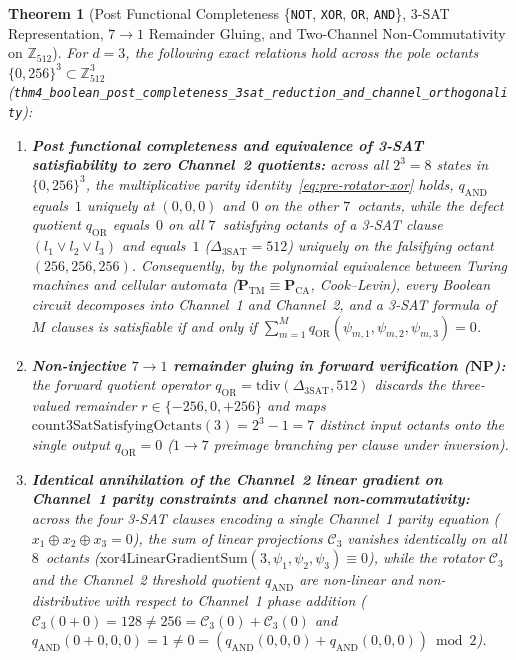 \documentclass[11pt,a4paper]{article}
\theoremstyle{plain}
\newtheorem{theorem}{Theorem}[section]
\theoremstyle{definition}
\begin{document}
\begin{theorem}[Post Functional Completeness \{\texttt{NOT}, \texttt{XOR}, \texttt{OR}, \texttt{AND}\}, 3-SAT Representation, $7\to 1$ Remainder Gluing, and Two-Channel Non-Commutativity on $\mathbb{Z}_{512}$]
\label{thm:main-4}
For $d=3$, the following exact relations hold across the pole octants $\{0,256\}^3\subset\mathbb{Z}_{512}^3$ (\texttt{thm4\_boolean\_post\_completeness\_3sat\_reduction\_and\_channel\_orthogonality}):
\begin{enumerate}[label=\textbf{(\roman*)},leftmargin=*]
\item \textbf{Post functional completeness and equivalence of 3-SAT satisfiability to zero Channel~2 quotients:}
  across all $2^3=8$ states in $\{0,256\}^3$, the multiplicative parity identity~\eqref{eq:pre-rotator-xor} holds, $q_{\mathrm{AND}}$ equals~$1$ uniquely at $(0,0,0)$ and~$0$ on the other $7$~octants, while the defect quotient $q_{\mathrm{OR}}$ equals~$0$ on all $7$~satisfying octants of a 3-SAT clause $(l_1\lor l_2\lor l_3)$ and equals~$1$ ($\Delta_{\mathrm{3SAT}}=512$) uniquely on the falsifying octant $(256,256,256)$. Consequently, by the polynomial equivalence between Turing machines and cellular automata ($\mathbf{P}_{\mathrm{TM}}\equiv\mathbf{P}_{\mathrm{CA}}$, Cook--Levin), every Boolean circuit decomposes into Channel~1 and Channel~2, and a 3-SAT formula of $M$ clauses is satisfiable if and only if $\sum_{m=1}^M q_{\mathrm{OR}}(\psi_{m,1},\psi_{m,2},\psi_{m,3}) = 0$.
\item \textbf{Non-injective $7\to 1$ remainder gluing in forward verification ($\mathbf{NP}$):}
  the forward quotient operator $q_{\mathrm{OR}}=\mathrm{tdiv}(\Delta_{\mathrm{3SAT}},512)$ discards the three-valued remainder $r\in\{-256,0,+256\}$ and maps $\mathrm{count3SatSatisfyingOctants}(3)=2^3-1=7$ distinct input octants onto the single output $q_{\mathrm{OR}}=0$ ($1\to 7$ preimage branching per clause under inversion).
\item \textbf{Identical annihilation of the Channel~2 linear gradient on Channel~1 parity constraints and channel non-commutativity:}
  across the four 3-SAT clauses encoding a single Channel~1 parity equation ($x_1\oplus x_2\oplus x_3=0$), the sum of linear projections $\mathcal{C}_3$ vanishes identically on all $8$~octants ($\mathrm{xor4LinearGradientSum}(3,\psi_1,\psi_2,\psi_3)\equiv 0$), while the rotator $\mathcal{C}_3$ and the Channel~2 threshold quotient $q_{\mathrm{AND}}$ are non-linear and non-distributive with respect to Channel~1 phase addition ($\mathcal{C}_3(0+0)=128\ne 256=\mathcal{C}_3(0)+\mathcal{C}_3(0)$ and $q_{\mathrm{AND}}(0+0,0,0)=1\ne 0=(q_{\mathrm{AND}}(0,0,0)+q_{\mathrm{AND}}(0,0,0))\bmod 2$).

\end{enumerate}
\end{theorem}
\end{document}
